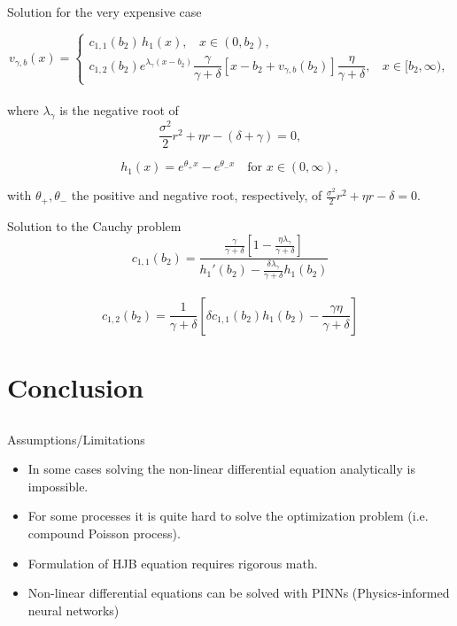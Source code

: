 \documentclass{beamer}
\theoremstyle{definition}
\begin{document}
\begin{frame}{Solution for the very expensive case}

\[
v_{\gamma,b}(x)=
\begin{cases}
c_{1,1}(b_2)\,h_1(x), \ \ \ \ x\in(0,b_2),\\[4pt]
c_{1,2}(b_2)e^{\lambda_\gamma(x-b_2)}
\dfrac{\gamma}{\gamma+\delta}\!\left[x-b_2+v_{\gamma,b}(b_2)\right]
\dfrac{\eta}{\gamma+\delta}, \ \ \ \  x\in[b_2,\infty),
\end{cases}
\]\\


where \(\lambda_\gamma\) is the negative root of 
\[
\frac{\sigma^2}{2}r^2+\eta r-(\delta+\gamma)=0,
\]

\[
h_1(x)=e^{\theta_+ x}-e^{\theta_- x}\quad \text{for } x\in(0,\infty),
\]


with \(\theta_+,\theta_-\) the positive and negative root, respectively, of 
\(\frac{\sigma^2}{2}r^2+\eta r-\delta=0.
\)


\end{frame}

\begin{frame}{Solution to the Cauchy problem}
\[
c_{1,1}(b_2)=
\frac{\frac{\gamma}{\gamma+\delta}\!\left[1-\frac{\eta\lambda_\gamma}{\gamma+\delta}\right]}
{h_1'(b_2)-\frac{\delta\lambda_\gamma}{\gamma+\delta}h_1(b_2)}\]
\\
\[
c_{1,2}(b_2)=
\frac{1}{\gamma+\delta}
\left[\delta c_{1,1}(b_2)h_1(b_2)-\frac{\gamma\eta}{\gamma+\delta}\right]
\]

\end{frame}

\section{Conclusion}
\subsection{}

\begin{frame}{Assumptions/Limitations}
\begin{itemize}
    \item In some cases solving the non-linear differential equation analytically is impossible.
    \item For some processes it is quite hard to solve the optimization problem (i.e. compound Poisson process).
    \item Formulation of HJB equation requires rigorous math.
    \item Non-linear differential equations can be solved with PINNs (Physics-informed neural networks)
\end{itemize}

\end{frame}
\end{document}
